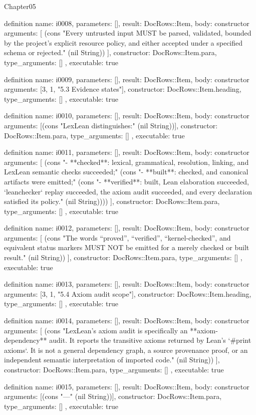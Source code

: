 \begin{lexlean}{Chapter05}
\begin{semanticmodule}
definition{
  name: i0008,
  parameters: [],
  result: DocRows::Item,
  body: constructor{
    arguments: [
      (cons "Every untrusted input MUST be parsed, validated, bounded by the project's explicit resource policy, and either accepted under a specified schema or rejected." (nil String))
    ],
    constructor: DocRows::Item.para,
    type_arguments: []
  },
  executable: true
}

definition{
  name: i0009,
  parameters: [],
  result: DocRows::Item,
  body: constructor{
    arguments: [3, 1, "5.3 Evidence states"],
    constructor: DocRows::Item.heading,
    type_arguments: []
  },
  executable: true
}

definition{
  name: i0010,
  parameters: [],
  result: DocRows::Item,
  body: constructor{
    arguments: [(cons "LexLean distinguishes:" (nil String))],
    constructor: DocRows::Item.para,
    type_arguments: []
  },
  executable: true
}

definition{
  name: i0011,
  parameters: [],
  result: DocRows::Item,
  body: constructor{
    arguments: [
      (cons "- **checked**: lexical, grammatical, resolution, linking, and LexLean semantic checks succeeded;" (cons "- **built**: checked, and canonical artifacts were emitted;" (cons "- **verified**: built, Lean elaboration succeeded, `leanchecker` replay succeeded, the axiom audit succeeded, and every declaration satisfied its policy." (nil String))))
    ],
    constructor: DocRows::Item.para,
    type_arguments: []
  },
  executable: true
}

definition{
  name: i0012,
  parameters: [],
  result: DocRows::Item,
  body: constructor{
    arguments: [
      (cons "The words “proved”, “verified”, “kernel-checked”, and equivalent status markers MUST NOT be emitted for a merely checked or built result." (nil String))
    ],
    constructor: DocRows::Item.para,
    type_arguments: []
  },
  executable: true
}

definition{
  name: i0013,
  parameters: [],
  result: DocRows::Item,
  body: constructor{
    arguments: [3, 1, "5.4 Axiom audit scope"],
    constructor: DocRows::Item.heading,
    type_arguments: []
  },
  executable: true
}

definition{
  name: i0014,
  parameters: [],
  result: DocRows::Item,
  body: constructor{
    arguments: [
      (cons "LexLean's axiom audit is specifically an **axiom-dependency** audit. It reports the transitive axioms returned by Lean's `#print axioms`. It is not a general dependency graph, a source provenance proof, or an independent semantic interpretation of imported code." (nil String))
    ],
    constructor: DocRows::Item.para,
    type_arguments: []
  },
  executable: true
}

definition{
  name: i0015,
  parameters: [],
  result: DocRows::Item,
  body: constructor{
    arguments: [(cons "---" (nil String))],
    constructor: DocRows::Item.para,
    type_arguments: []
  },
  executable: true
}
\end{semanticmodule}
\end{lexlean}
